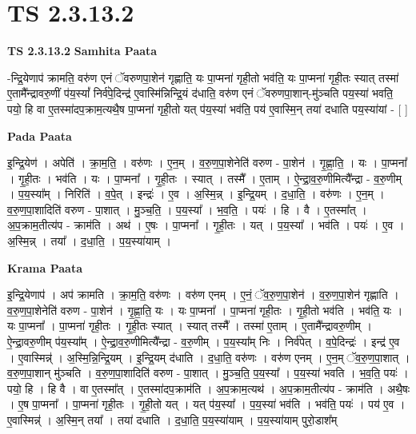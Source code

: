 \documentclass[17pt]{extarticle}
\begin{document}
\section{ TS 2.3.13.2 }

\textbf{TS 2.3.13.2 } \newline
\textbf{Samhita Paata} \newline

-न्द्रि॒येणाप॑ क्रामति॒ वरु॑ण एनं ॅवरुणपा॒शेन॑ गृह्णाति॒ यः पा॒प्मना॑ गृही॒तो भव॑ति॒ यः पा॒प्मना॑ गृही॒तः स्यात् तस्मा॑ ए॒तामै᳚न्द्रावरु॒णीं प॑य॒स्यां᳚ निर्व॑पे॒दिन्द्र॑ ए॒वास्मि॑न्निन्द्रि॒यं द॑धाति॒ वरु॑ण एनं ॅवरुणपा॒शान्-मु॑ञ्चति पय॒स्या॑ भवति॒ पयो॒ हि वा ए॒तस्मा॑दप॒क्राम॒त्यथै॒ष पा॒प्मना॑ गृही॒तो यत् प॑य॒स्या॑ भव॑ति॒ पय॑ ए॒वास्मि॒न् तया॑ दधाति पय॒स्या॑यां - [  ] \newline

\textbf{Pada Paata} \newline

इ॒न्द्रि॒येण॑ । अपेति॑ । क्रा॒म॒ति॒ । वरु॑णः । ए॒न॒म् । व॒रु॒ण॒पा॒शेनेति॑ वरुण - पा॒शेन॑ । गृ॒ह्णा॒ति॒ । यः । पा॒प्मना᳚ । गृ॒ही॒तः । भव॑ति । यः ।   पा॒प्मना᳚ । गृ॒ही॒तः । स्यात् । तस्मै᳚ । ए॒ताम् । ऐ॒न्द्रा॒व॒रु॒णीमित्यै᳚न्द्रा - व॒रु॒णीम् । प॒य॒स्या᳚म् । निरिति॑ । व॒पे॒त् । इन्द्रः॑ । ए॒व । अ॒स्मि॒न्न् । इ॒न्द्रि॒यम् । द॒धा॒ति॒ । वरु॑णः । ए॒न॒म् । व॒रु॒ण॒पा॒शादिति॑ वरुण - पा॒शात् । मु॒ञ्च॒ति॒ । प॒य॒स्या᳚ । भ॒व॒ति॒ । पयः॑ । हि । वै । ए॒तस्मा᳚त् । अ॒प॒क्राम॒तीत्य॑प - क्राम॑ति । अथ॑ । ए॒षः । पा॒प्मना᳚ । गृ॒ही॒तः । यत् । प॒य॒स्या᳚ । भव॑ति । पयः॑ । ए॒व । अ॒स्मि॒न्न् । तया᳚ । द॒धा॒ति॒ । प॒य॒स्या॑याम् ।  \newline


\textbf{Krama Paata} \newline

इ॒न्द्रि॒येणाप॑ । अप॑ क्रामति । क्रा॒म॒ति॒ वरु॑णः । वरु॑ण एनम् । ए॒नं॒ ॅव॒रु॒ण॒पा॒शेन॑ । व॒रु॒ण॒पा॒शेन॑ गृह्णाति । व॒रु॒ण॒पा॒शेनेति॑ वरुण - पा॒शेन॑ । गृ॒ह्णा॒ति॒ यः । यः पा॒प्मना᳚ । पा॒प्मना॑ गृही॒तः । गृ॒ही॒तो भव॑ति । भव॑ति॒ यः । यः पा॒प्मना᳚ । पा॒प्मना॑ गृही॒तः । गृ॒ही॒तः स्यात् । स्यात् तस्मै᳚ । तस्मा॑ ए॒ताम् । ए॒तामै᳚न्द्रावरु॒णीम् । ऐ॒न्द्रा॒वरु॒णीम् प॑य॒स्या᳚म् । ऐ॒न्द्रा॒व॒रु॒णीमित्यै᳚न्द्रा - व॒रु॒णीम् । प॒य॒स्या᳚म् निः । निर्व॑पेत् । व॒पे॒दिन्द्रः॑ । इन्द्र॑ ए॒व । ए॒वास्मिन्न्॑ । अ॒स्मि॒न्नि॒न्द्रि॒यम् । इ॒न्द्रि॒यम् द॑धाति । द॒धा॒ति॒ वरु॑णः । वरु॑ण एनम् । ए॒न॒म् ॅव॒रु॒ण॒पा॒शात् । व॒रु॒ण॒पा॒शान् मु॑ञ्चति । व॒रु॒ण॒पा॒शादिति॑ वरुण - पा॒शात् । मु॒ञ्च॒ति॒ प॒य॒स्या᳚ । प॒य॒स्या॑ भवति । भ॒व॒ति॒ पयः॑ । पयो॒ हि । हि वै । वा ए॒तस्मा᳚त् । ए॒तस्मा॑दप॒क्राम॑ति । अ॒प॒क्राम॒त्यथ॑ । अ॒प॒क्राम॒तीत्य॑प - क्राम॑ति । अथै॒षः । ए॒ष पा॒प्मना᳚ । पा॒प्मना॑ गृही॒तः । गृ॒ही॒तो यत् । यत् प॑य॒स्या᳚ । प॒य॒स्या॑ भव॑ति । भव॑ति॒ पयः॑ । पय॑ ए॒व । ए॒वास्मिन्न्॑ । अ॒स्मि॒न् तया᳚ । तया॑ दधाति । द॒धा॒ति॒ प॒य॒स्या॑याम् । प॒य॒स्या॑याम् पुरो॒डाश᳚म् \newline
\end{document}
